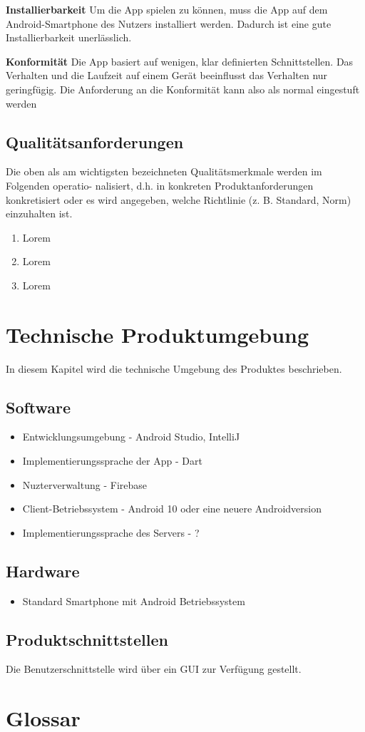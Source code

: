 \documentclass[parskip=full]{scrartcl}
\begin{document}
\textbf{Installierbarkeit}\newline
Um die App spielen zu können, muss die App auf dem Android-Smartphone des Nutzers installiert werden.
Dadurch ist eine gute Installierbarkeit unerlässlich.

\textbf{Konformität}\newline
Die App basiert auf wenigen, klar definierten Schnittstellen. Das Verhalten und die Laufzeit auf einem Gerät beeinflusst das Verhalten nur geringfügig. Die Anforderung an die Konformität kann also als normal eingestuft werden

\subsection{Qualitätsanforderungen}
Die oben als am wichtigsten bezeichneten Qualitätsmerkmale werden im Folgenden operatio- nalisiert, d.h. in konkreten Produktanforderungen konkretisiert oder es wird angegeben, welche Richtlinie (z. B. Standard, Norm) einzuhalten ist.

\begin{enumerate}[start=1,label={$\langle$\bfseries Q\arabic*$\rangle$}, leftmargin = 5em, itemsep=4pt, parsep=4pt]
    \item Lorem
    \item Lorem
    \item Lorem
\end{enumerate}

\section{Technische Produktumgebung}
In diesem Kapitel wird die technische Umgebung des Produktes beschrieben.

\subsection{Software}
\begin{itemize}
    \item Entwicklungsumgebung - Android Studio, IntelliJ
    \item Implementierungssprache der App - Dart
    \item Nuzterverwaltung - Firebase
    \item Client-Betriebssystem - Android 10 oder eine neuere Androidversion
    \item Implementierungssprache des Servers - ?
\end{itemize}

\subsection{Hardware}
\begin{itemize}
    \item Standard Smartphone mit Android Betriebssystem
\end{itemize}

\subsection{Produktschnittstellen}
Die Benutzerschnittstelle wird über ein GUI zur Verfügung gestellt.
\newpage

\section{Glossar}
\printglossary
\end{document}
